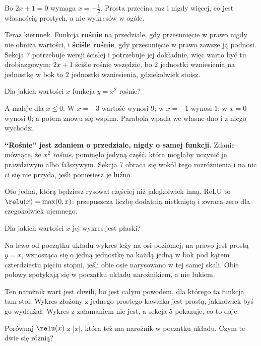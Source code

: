 \begin{fr}
Bo $2x + 1 = 0$ wymaga $x = -\frac{1}{2}$. Prosta przecina raz i nigdy więcej,
co jest własnością prostych, a nie wykresów w ogóle.

Teraz kierunek. Funkcja \textbf{rośnie} na przedziale, gdy przesunięcie w
prawo nigdy nie obniża wartości, i \textbf{ściśle rośnie}, gdy przesunięcie w
prawo zawsze ją podnosi. Sekcja 7 potrzebuje wersji ścisłej i potrzebuje jej
dokładnie, więc warto być tu drobiazgowym: $2x + 1$ ściśle rośnie wszędzie, bo
$2$ jednostki wzniesienia na jednostkę w bok to $2$ jednostki wzniesienia,
gdziekolwiek stoisz.

Dla jakich wartości $x$ funkcja $y = x^{2}$ rośnie?
\nextframe
\end{fr}

\begin{fr}
A maleje dla $x \le 0$. W $x = -3$ wartość wynosi $9$; w $x = -1$ wynosi $1$; w
$x = 0$ wynosi $0$; a potem znowu się wspina. Parabola wpada we własne dno i
z niego wychodzi.

\begin{warning}
\textbf{\enquote{Rośnie} jest zdaniem o przedziale, nigdy o samej funkcji.}
Zdanie mówiące, że \emph{$x^{2}$ rośnie}, pominęło jedyną część, która mogłaby
uczynić je prawdziwym albo fałszywym. Sekcja 7 obraca się wokół tego
rozróżnienia i na nic ci się nie przyda, jeśli poniesiesz je luźno.
\end{warning}

Oto jedna, którą będziesz rysował częściej niż jakąkolwiek inną. ReLU to
$\relu(x) = \max(0, x)$: przepuszcza liczbę dodatnią nietkniętą
i zwraca zero dla czegokolwiek ujemnego.

Dla jakich wartości $x$ jej wykres jest płaski?
\nextframe
\end{fr}

\begin{fr}
Na lewo od początku układu wykres leży na osi poziomej; na prawo jest prostą
$y = x$, wznosząca się o jedną jednostkę na każdą jedną w bok \dash{} pod
kątem czterdziestu pięciu stopni, jeśli obie osie narysowano w tej samej skali.
Obie połowy spotykają się w początku układu narożnikiem, a nie łukiem.

Ten narożnik wart jest chwili, bo jest całym powodem, dla którego ta funkcja
tam stoi. Wykres złożony z jednego prostego kawałka jest prostą, jakkolwiek
byś go wydłużał. Wykres z załamaniem nie jest, a sekcja 5 pokazuje, co to daje.

Porównaj $\relu(x)$ z $\lvert x \rvert$, która też ma narożnik w początku
układu. Czym te dwie się różnią?
\nextframe
\end{fr}

